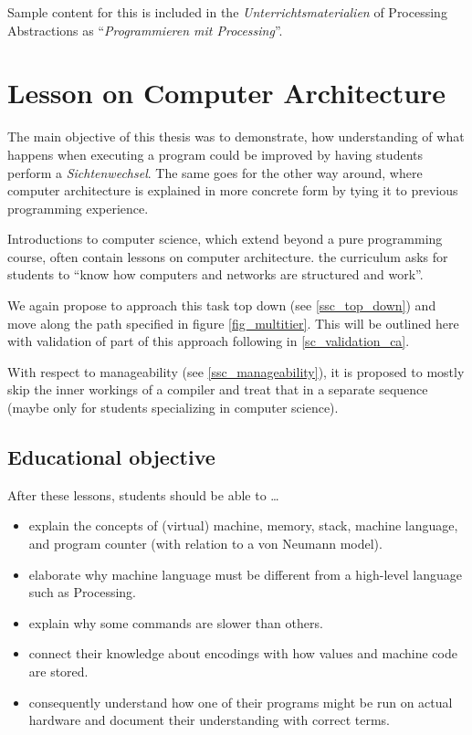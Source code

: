 Sample content for this is included in the \emph{Unterrichtsmaterialien} of Processing Abstractions as ``\emph{Programmieren mit Processing}''.



\section{Lesson on Computer Architecture} \label{sc_lesson_ca}

The main objective of this thesis was to demonstrate, how understanding of what happens when executing a program could be improved by having students perform a \emph{Sichtenwechsel}. The same goes for the other way around, where computer architecture is explained in more concrete form by tying it to previous programming experience.

Introductions to computer science, which extend beyond a pure programming course, often contain lessons on computer architecture. \eg the curriculum \cite[p.\,145]{Erz16} asks for students to ``know how computers and networks are structured and work''.

We again propose to approach this task top down (see \ref{ssc_top_down}) and move along the path specified in figure \ref{fig_multitier}. This will be outlined here with validation of part of this approach following in \ref{sc_validation_ca}.

With respect to manageability (see \ref{ssc_manageability}), it is proposed to mostly skip the inner workings of a compiler and treat that in a separate sequence (maybe only for students specializing in computer science).


\subsection{Educational objective}

After these lessons, students should be able to \dots
\begin{itemize}
\item explain the concepts of (virtual) machine, memory, stack, machine language, and program counter (with relation to a von Neumann model).
\item elaborate why machine language must be different from a high-level language such as Processing.
\item explain why some commands are slower than others.
\item connect their knowledge about encodings with how values and machine code are stored.
\item consequently understand how one of their programs might be run on actual hardware and document their understanding with correct terms.
\end{itemize}


